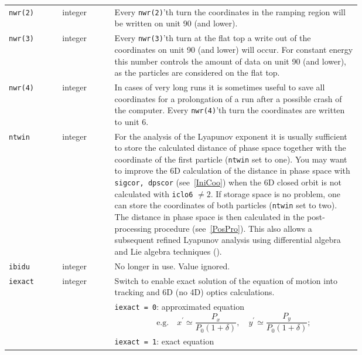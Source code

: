 \begin{longtabu}{@{}llp{0.7\linewidth}}
    \texttt{nwr(2)}        & integer  & Every \texttt{nwr(2)}'th turn the coordinates in the ramping region will be written on unit 90 (and lower). \\
    \texttt{nwr(3)}        & integer  & Every \texttt{nwr(3)}'th turn at the flat top a write out of the coordinates on unit 90 (and lower) will occur. For constant energy this number controls the amount of data on unit 90 (and lower), as the particles are considered on the flat top. \\
    \texttt{nwr(4)}        & integer  & In cases of very long runs it is sometimes useful to save all coordinates for a prolongation of a run after a possible crash of the computer. Every \texttt{nwr(4)}'th turn the coordinates are written to unit 6. \\
    \texttt{ntwin}         & integer  & For the analysis of the Lyapunov exponent it is usually sufficient to store the calculated distance of phase space together with the coordinate of the first particle (\texttt{ntwin} set to one). You may want to improve the 6D calculation of the distance in phase space with \texttt{sigcor, dpscor} (see~\ref{IniCoo}) when the 6D closed orbit is not calculated with \texttt{iclo6} $\neq 2$. If storage space is no problem, one can store the coordinates of both particles (\texttt{ntwin} set to two). The distance in phase space is then calculated in the post-processing procedure (see~\ref{PosPro}). This also allows a subsequent refined Lyapunov analysis using differential algebra and Lie algebra techniques (\cite{Refine}). \\
    \texttt{ibidu}         & integer  & No longer in use. Value ignored. \\
    \texttt{iexact}        & integer  & Switch to enable exact solution of the equation of motion into tracking and 6D (no 4D) optics calculations. \\
                           &          & \texttt{iexact = 0}: approximated equation
                           \begin{equation*}
                                \mbox{e.g.}
                                \quad x^\prime \simeq \frac{P_x}{P_0(1+\delta)},
                                \quad y^\prime \simeq \frac{P_y}{P_0(1+\delta)};
                           \end{equation*} \\
                           &          & \texttt{iexact = 1}: exact equation
                           \begin{equation*}

\end{equation*}
\end{longtabu}

